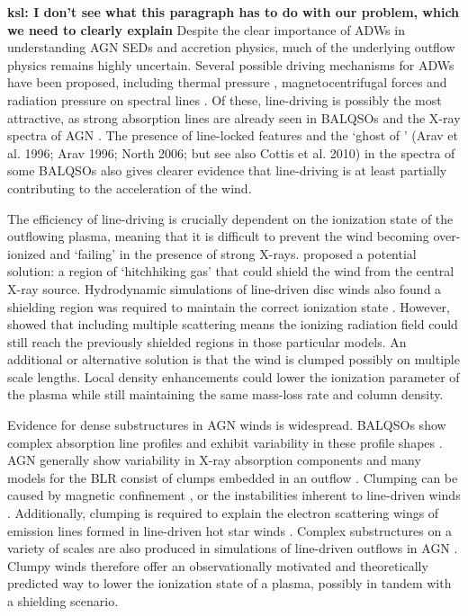 \documentclass[preprint, a4paper, 11pt]{aastex}
\begin{document}
{\bf ksl: I don't see what this paragraph has to do with our problem, which we need to clearly explain} Despite the clear importance of ADWs in understanding AGN SEDs and accretion physics, 
much of the underlying outflow physics remains highly uncertain. 
Several possible driving mechanisms for ADWs have been proposed, including
thermal pressure \citep{weymann1982, begelman1991}, magnetocentrifugal forces 
\citep{blandfordpayne,pelletier_pudritz} and 
radiation pressure on spectral lines \citep[`line-driving';][]{lucysolomon1970,shlosman1985,MCGV95}.
Of these, line-driving is possibly the most attractive, as
strong absorption lines are already seen in BALQSOs and the X-ray spectra of AGN 
\citep{reeves2003,poundsreeves2009,tombesi2010a}.
The presence of line-locked features \citep{bowler2014} 
and the `ghost of \la' (Arav et al. 1996; Arav 1996; North 2006; but see 
also Cottis et al. 2010) \nocite{arav1995, arav1996, north2006,cottis2010}
in the spectra of some BALQSOs also gives clearer evidence that line-driving is
at least partially contributing to the acceleration of the wind.

The efficiency of line-driving is crucially dependent on the ionization state 
of the outflowing plasma, meaning that it is difficult to prevent 
the wind becoming over-ionized and `failing' in the presence of strong X-rays. 
\cite{MCGV95} proposed a potential solution: 
a region of `hitchhiking gas' that could shield the wind from the central X-ray source. 
Hydrodynamic simulations of line-driven disc winds also found a shielding region
was required to maintain the correct ionization state \citep{PSK2000,PK04}. 
However, \cite{H14} showed that including multiple scattering means the ionizing radiation 
field could still reach the previously shielded regions in those particular models.
An additional or alternative solution is that the wind is clumped \citep[e.g.][]{hamann2013}
possibly on multiple scale lengths. Local density enhancements could lower the 
ionization parameter of the plasma while still maintaining the same mass-loss 
rate and column density. 

Evidence for dense substructures in AGN winds is widespread.
BALQSOs show complex absorption line profiles \citep{ganguly2006, simonhamann2010}
and exhibit variability in these profile shapes \citep{capellupo2011,capellupo2012,capellupo2014}.
AGN generally show variability in X-ray absorption components \citep[e.g.][]{risaliti2002}
and many models for the BLR consist of clumps embedded in an outflow 
\citep{krolik1981, emmering1992, dekool1995, cassidyraine1996}.
Clumping can be caused by magnetic confinement \cite{dekool1995},
or the instabilities inherent to line-driven winds 
\citep{lucysolomon1970,macgregor1979,carlberg1980,owockirybicki1984,owockirybicki1985}.
Additionally, clumping is required to explain the electron scattering wings of emission lines formed
in line-driven hot star winds \citep{hillier1991eswingsmodel}. Complex substructures 
on a variety of scales are also produced in simulations of line-driven 
outflows in AGN \citep{PSK2000,PK04,progakurosawa2010,proga2014}.
Clumpy winds therefore offer an observationally motivated and theoretically 
predicted way to lower the ionization state of a plasma, possibly in tandem
with a shielding scenario. 
\end{document}
